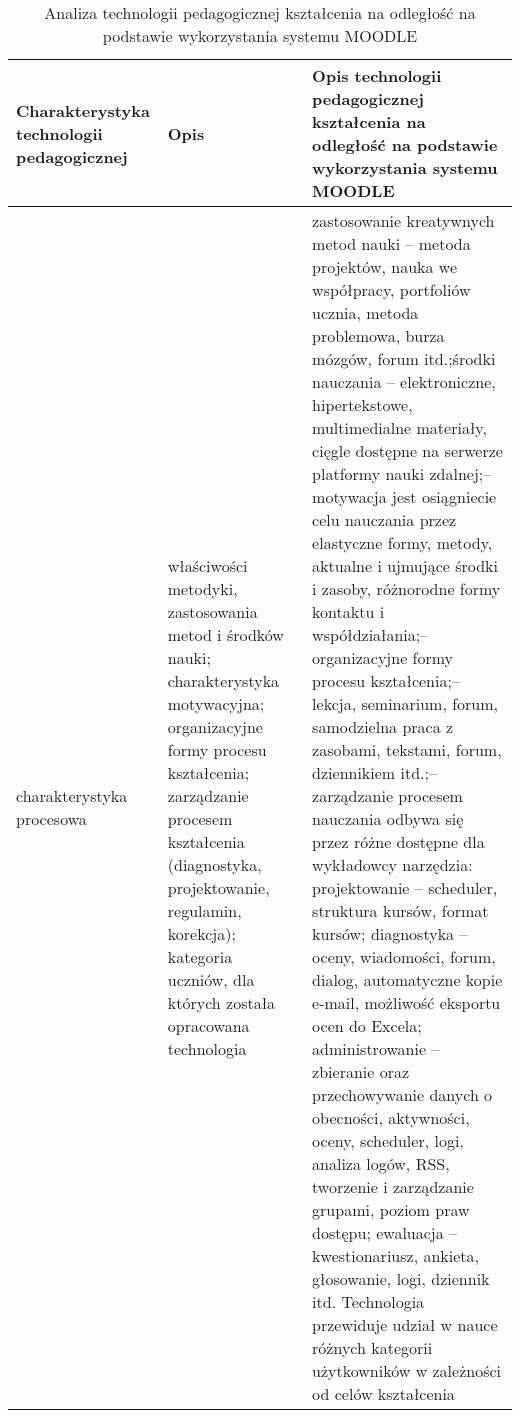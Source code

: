 	\begin{table}[!h]
		\centering
		\caption[c.d. Analiza technologii pedagogicznej w Moodle'u]{Analiza technologii pedagogicznej kształcenia na odległość na podstawie wykorzystania systemu MOODLE}
		\label{tab:cd_pedagogika}
		\begin{tabular}{|p{4cm}|p{4cm}|p{9cm}|} \hline
			\textbf{Charakterystyka technologii pedagogicznej} & \textbf{Opis} & \textbf{Opis technologii pedagogicznej
kształcenia na odległość na podstawie
wykorzystania systemu MOODLE} \\ \hline
			charakterystyka procesowa & właściwości metodyki, zastosowania metod i środków nauki; charakterystyka motywacyjna; organizacyjne formy procesu kształcenia; zarządzanie procesem kształcenia (diagnostyka, projektowanie, regulamin, korekcja); kategoria uczniów, dla których została opracowana technologia & zastosowanie kreatywnych metod nauki \newline– metoda projektów, nauka we współpracy, portfoliów ucznia, metoda problemowa, burza mózgów, forum itd.;\newline środki nauczania – elektroniczne, hipertekstowe, multimedialne materiały, cięgle dostępne na serwerze platformy nauki zdalnej;\newline – motywacja jest osiągniecie celu nauczania przez elastyczne formy, metody, aktualne i ujmujące środki i zasoby, różnorodne formy kontaktu i współdziałania;\newline – organizacyjne formy procesu kształcenia;\newline – lekcja, seminarium, forum, samodzielna praca z zasobami, tekstami, forum, dziennikiem itd.;\newline – zarządzanie procesem nauczania odbywa się przez różne dostępne dla wykładowcy narzędzia: \newline projektowanie – scheduler, struktura kursów, format kursów; \newline diagnostyka – oceny, wiadomości, forum, dialog, automatyczne kopie e-mail, możliwość eksportu ocen do Excela; \newline administrowanie – zbieranie oraz przechowywanie danych o obecności, aktywności, oceny, scheduler, logi, analiza logów, RSS, tworzenie i zarządzanie grupami, poziom praw dostępu; \newline ewaluacja – kwestionariusz, ankieta, głosowanie, logi, dziennik itd. Technologia przewiduje udział w nauce różnych kategorii użytkowników w zależności od celów kształcenia\\ \hline
		\end{tabular}
		\end{table}

